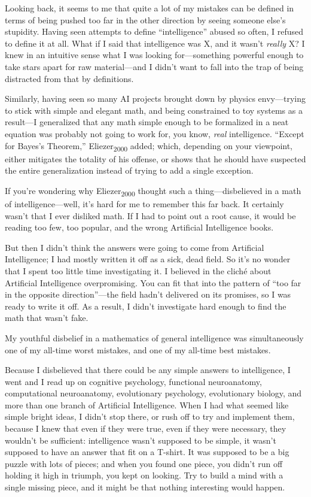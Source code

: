 {
 Looking back, it seems to me that quite a lot of my mistakes can
be defined in terms of being pushed too far in the other direction by
seeing someone else's stupidity. Having seen attempts
to define ``intelligence'' abused so
often, I refused to define it at all. What if I said that intelligence
was X, and it wasn't \textit{really} X? I knew in an
intuitive sense what I was looking for---something powerful enough to
take stars apart for raw material---and I didn't want
to fall into the trap of being distracted from that by definitions.}

{
 Similarly, having seen so many AI projects brought down by physics
envy---trying to stick with simple and elegant math, and being
constrained to toy systems as a result---I generalized that any math
simple enough to be formalized in a neat equation was probably not
going to work for, you know, \textit{real} intelligence.
``Except for Bayes's
Theorem,'' Eliezer\textsubscript{2000} added; which,
depending on your viewpoint, either mitigates the totality of his
offense, or shows that he should have suspected the entire
generalization instead of trying to add a single exception.}

{
 If you're wondering why
Eliezer\textsubscript{2000} thought such a thing---disbelieved in a
math of intelligence---well, it's hard for me to
remember this far back. It certainly wasn't that I ever
disliked math. If I had to point out a root cause, it would be reading
too few, too popular, and the wrong Artificial Intelligence books.}

{
 But then I didn't think the answers were going to
come from Artificial Intelligence; I had mostly written it off as a
sick, dead field. So it's no wonder that I spent too
little time investigating it. I believed in the cliché about Artificial
Intelligence overpromising. You can fit that into the pattern of
``too far in the opposite
direction''---the field hadn't
delivered on its promises, so I was ready to write it off. As a result,
I didn't investigate hard enough to find the math that
wasn't fake.}

{
 My youthful disbelief in a mathematics of general intelligence was
simultaneously one of my all-time worst mistakes, and one of my
all-time best mistakes.}

{
 Because I disbelieved that there could be any simple answers to
intelligence, I went and I read up on cognitive psychology, functional
neuroanatomy, computational neuroanatomy, evolutionary psychology,
evolutionary biology, and more than one branch of Artificial
Intelligence. When I had what seemed like simple bright ideas, I
didn't stop there, or rush off to try and implement
them, because I knew that even if they were true, even if they were
necessary, they wouldn't be sufficient: intelligence
wasn't supposed to be simple, it wasn't
supposed to have an answer that fit on a T-shirt. It was supposed to be
a big puzzle with lots of pieces; and when you found one piece, you
didn't run off holding it high in triumph, you kept on
looking. Try to build a mind with a single missing piece, and it might
be that nothing interesting would happen.}

